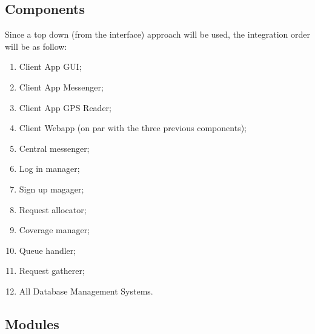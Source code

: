 \subsection{Components}
Since a top down (from the interface) approach will be used, the integration order will be as follow:
\begin{enumerate}
\item Client App GUI;
\item Client App Messenger;
\item Client App GPS Reader;
\item Client Webapp (on par with the three previous components);
\item Central messenger;
\item Log in manager;
\item Sign up magager;
\item Request allocator;
\item Coverage manager;
\item Queue handler;
\item Request gatherer;
\item All Database Management Systems.
\end{enumerate}

\subsection{Modules}
